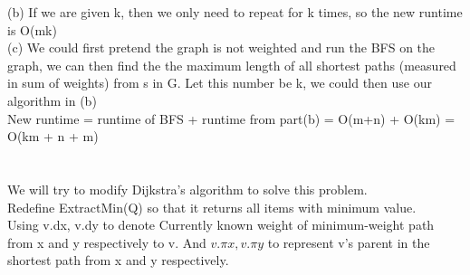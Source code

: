 \documentclass[12pt]{article}
\begin{document}
(b) If we are given k, then we only need to repeat for k times, so the new runtime is O(mk)\\

(c) We could first pretend the graph is not weighted and run the BFS on the graph, we can then find the  the maximum length of all shortest paths (measured in sum of weights) from s in G. Let this number be k, we could then use our algorithm in (b)\\

New runtime = runtime of BFS + runtime from part(b) = O(m+n) + O(km) = O(km + n + m)

\pagebreak
\section{}
We will try to modify Dijkstra's  algorithm to solve this problem.\\
Redefine ExtractMin(Q) so that it returns all items with minimum value.\\ 

Using v.dx, v.dy to denote Currently known weight of minimum-weight path from x and y respectively to v. And $v.\pi x, v.\pi y$ to represent v's parent in the shortest path from x and y respectively.\\
\end{document}
